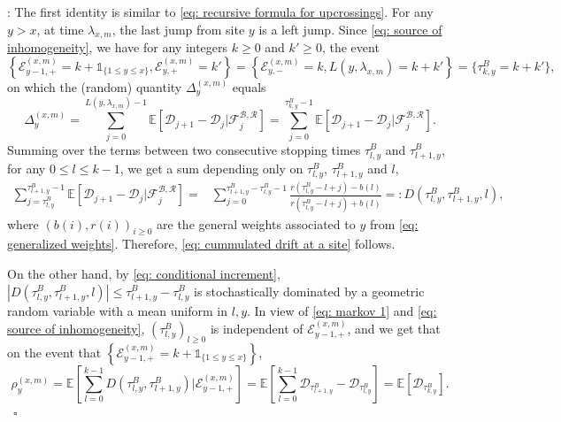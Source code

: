 \documentclass[twoside,12pt,a4paper]{article}
\numberwithin{equation}{section}
\newenvironment{proof}[1][Proof]{{\sc #1}:}{~\hfill $\square$}
\newcommand{\abs}[1]{\left\vert #1 \right\vert}
\begin{document}
	\begin{proof} 
		The first identity is similar to \eqref{eq: recursive formula for upcrossings}.
		For any $y>x $, at time $\lambda_{x,m}$, the last jump from site $y$ is a left jump. Since \eqref{eq: source of inhomogeneity}, we have for any integers $k\geq 0$ and $k' \geq 0$, the event 
		$$\left\{ \mathcal{E}^{(x,m)}_{y-1,+} =k +  \mathbb{1}_{\{1\leq y\leq x\}}, \mathcal{E}^{(x,m)}_{y,+} = k'\right\} = \left\{\mathcal{E}^{(x,m)}_{y,-} =k,  L(y,\lambda_{x,m}) = k+k' \right\} = \{ \tau^B_{k,y} = k+k' \},$$ on which the (random) quantity $\Delta_{y}^{(x,m)}$ equals
		\[
		\Delta_{y}^{(x,m)} =\sum_{j=0}^{ L(y,\lambda_{x,m})-1} \mathbb{E}\left[ \mathcal{D}_{j+1} -\mathcal{D}_{j}  \vert \mathcal{F}^{\mathcal{B},\mathcal{R}}_{j} \right] = \sum_{j=0}^{\tau^B_{k,y}-1} \mathbb{E}\left[ \mathcal{D}_{j+1} -\mathcal{D}_{j}  \vert \mathcal{F}^{\mathcal{B},\mathcal{R}}_{j} \right].  
		\] 
		Summing over the terms between two consecutive stopping times $\tau^{B}_{l,y} $ and $\tau^{B}_{l+1,y} $, for any $0\leq l \leq k -1$,  we get a sum depending only on $\tau^{B}_{l,y} $, $\tau^{B}_{l+1,y} $ and $l$, 
		\begin{align} \label{eq: conditional increment}
			\sum_{j=\tau^{B}_{l,y}}^{\tau^B_{l+1,y}-1} \mathbb{E}\left[ \mathcal{D}_{j+1} - \mathcal{D}_{j}  \vert \mathcal{F}^{\mathcal{B},\mathcal{R}}_{j} \right] =&
			\sum_{j=0}^{\tau^B_{l+1,y}-\tau^{B}_{l,y}-1} \frac{ r(\tau^{B}_{l,y}-l + j) - b(l)  }{ r(\tau^{B}_{l,y}-l + j) + b(l)  } 
			=:  D\left(\tau^{B}_{l,y},\tau^{B}_{l+1,y},l\right),
		\end{align}   
		where $(b(i),r(i))_{i\geq 0}$ are the general weights associated to $y$ from \eqref{eq: generalized weights}. Therefore, \eqref{eq: cummulated drift at a site} follows.
		
		On the other hand, by \eqref{eq: conditional increment}, $\abs{  D\left(\tau^{B}_{l,y},\tau^{B}_{l+1,y},l\right)} \leq  \tau^{B}_{l+1,y}-\tau^{B}_{l,y}$ is stochastically dominated by a geometric random variable with a mean uniform in $l, y$. In view of \eqref{eq: markov 1} and \eqref{eq: source of inhomogeneity},  $\left(\tau^B_{l,y}\right)_{l \geq 0} $ is independent of $ \mathcal{E}^{(x,m)}_{y-1,+}$, and we get that on the event that ${ \left\{ \mathcal{E}^{(x,m)}_{y-1,+} = k + \mathbb{1}_{\{1\leq y\leq x\}}  \right\} }$, 
		\begin{equation*} 
			\rho_{y}^{(x,m)} = \mathbb{E}\left[ \sum_{l=0 }^{ k -1  }  D(\tau^{B}_{l,y},\tau^{B}_{l+1,y} ) \vert \mathcal{E}^{(x,m)}_{y-1,+} \right]	= \mathbb{E}\left[ \sum_{l=0}^{k-1}  \mathcal{D}_{\tau^{B}_{l+1,y}} -\mathcal{D}_{\tau^{B}_{l,y}} \right]  
			= \mathbb{E}\left[  \mathcal{D}_{\tau^{B}_{k,y}} \right].
		\end{equation*} 
	\end{proof}
	
\end{document}
